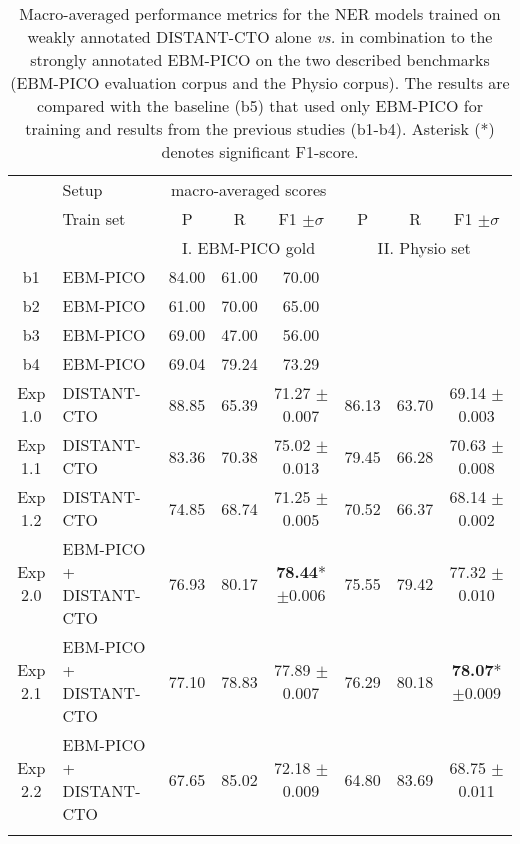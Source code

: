 \documentclass[letterpaper]{article} %
\begin{document}
%
%
%
\setlength{\tabcolsep}{4pt} %
\renewcommand{\arraystretch}{1.0}
\begin{table*}[hbt!]
    \centering
    \begin{tabular}{clccc|ccc}
        \Xhline{1pt}
         & Setup & \multicolumn{3}{c}{macro-averaged scores} \\
        \Xhline{1pt}
         & Train set & P & R & F1 $\pm\sigma$ & P & R & F1 $\pm\sigma$\\
        \hline 
        &  & \multicolumn{3}{c}{I. EBM-PICO gold} & \multicolumn{3}{c}{II. Physio set}  \\
        \hline
        b1 & EBM-PICO & 84.00 & 61.00 & 70.00 &  &  &\\
        b2 & EBM-PICO & 61.00 & 70.00 & 65.00 &  &  &\\
        b3 & EBM-PICO & 69.00 & 47.00 & 56.00 &  &  &\\
        b4 & EBM-PICO & 69.04 & 79.24 & 73.29 &  &  &\\
        \hline
        \hline 
        Exp 1.0 & DISTANT-CTO& 88.85 & 65.39 & 71.27 $\pm$0.007 & 86.13 & 63.70 & 69.14 $\pm$0.003\\
        Exp 1.1 & DISTANT-CTO & 83.36 & 70.38 & 75.02 $\pm$0.013 & 79.45 & 66.28 & 70.63 $\pm$0.008\\
        Exp 1.2 & DISTANT-CTO & 74.85 & 68.74 & 71.25 $\pm$0.005 & 70.52 & 66.37 & 68.14 $\pm$0.002 \\
        Exp 2.0 & EBM-PICO + DISTANT-CTO & 76.93  & 80.17  & \textbf{78.44}* $\pm$0.006 & 75.55  & 79.42 & 77.32 $\pm$0.010\\
        Exp 2.1 & EBM-PICO + DISTANT-CTO & 77.10 & 78.83 & 77.89 $\pm$0.007 & 76.29 & 80.18 & \textbf{78.07}* $\pm$0.009\\
        Exp 2.2 & EBM-PICO + DISTANT-CTO & 67.65 & 85.02 & 72.18 $\pm$0.009  & 64.80 & 83.69 & 68.75 $\pm$0.011 \\
        \Xhline{1pt}
    \end{tabular}
    \caption{Macro-averaged performance metrics for the NER models trained on weakly annotated DISTANT-CTO alone \textit{vs.} in combination to the strongly annotated EBM-PICO on the two described benchmarks (EBM-PICO evaluation corpus and the Physio corpus). The results are compared with the baseline (b5) that used only EBM-PICO for training and results from the previous studies (b1-b4). Asterisk (*) denotes significant F1-score.}
    \label{tab:results_modeltraining}
\end{table*}
%
\end{document}

